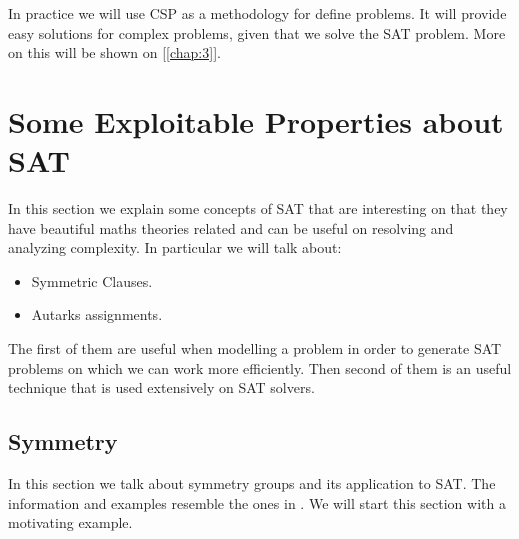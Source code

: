 In practice we will use CSP as a methodology for define problems. It will provide easy solutions for complex problems, given that we solve the SAT problem. More on this will be shown on [\ref{chap:3}].

\section{Some Exploitable Properties about SAT}
In this section we explain some concepts of SAT that are interesting on that they have beautiful maths theories related and can be useful on resolving and analyzing complexity. In particular we will talk about:
\begin{itemize}
\item Symmetric Clauses. 
\item Autarks assignments.
\end{itemize}

The first of them are useful when modelling a problem in order to generate SAT problems on which we can work more efficiently. Then second of them is an useful technique that is used extensively on SAT solvers.


\subsection{Symmetry}

In this section we talk about symmetry groups and its application to SAT. The information and examples resemble the ones in \cite{sakallah2009symmetry}. We will start this section with a motivating example.


